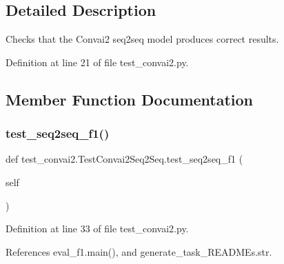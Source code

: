 \subsection{Detailed Description}
\begin{DoxyVerb}Checks that the Convai2 seq2seq model produces correct results.
\end{DoxyVerb}
 

Definition at line 21 of file test\+\_\+convai2.\+py.



\subsection{Member Function Documentation}
\mbox{\label{classtest__convai2_1_1TestConvai2Seq2Seq_af92bc095f0d62a64388b736f06b003a6}} 
\subsubsection{\texorpdfstring{test\+\_\+seq2seq\+\_\+f1()}{test\_seq2seq\_f1()}}
{\footnotesize\ttfamily def test\+\_\+convai2.\+Test\+Convai2\+Seq2\+Seq.\+test\+\_\+seq2seq\+\_\+f1 (\begin{DoxyParamCaption}\item[{}]{self }\end{DoxyParamCaption})}



Definition at line 33 of file test\+\_\+convai2.\+py.



References eval\+\_\+f1.\+main(), and generate\+\_\+task\+\_\+\+R\+E\+A\+D\+M\+Es.\+str.

